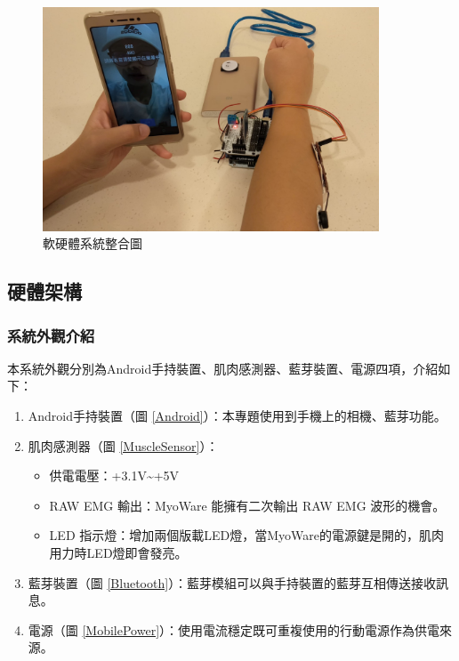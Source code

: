\documentclass[12pt]{article}  %
\theoremstyle{plain}
\begin{document}
\begin{figure}[h]  %
\centering
\includegraphics[width=10cm]{pic/ch2/system.jpg}
\caption{軟硬體系統整合圖} \label{system}
\end{figure}

\subsection{硬體架構}

\subsubsection{系統外觀介紹}
本系統外觀分別為Android手持裝置、肌肉感測器、藍芽裝置、電源四項，介紹如下：
\begin{enumerate}
\item Android手持裝置（圖 \ref{Android}）：本專題使用到手機上的相機、藍芽功能。
\item 肌肉感測器（圖 \ref{MuscleSensor}）：
\begin{itemize}
\item 供電電壓：+3.1V\textasciitilde +5V
\item RAW EMG 輸出：MyoWare 能擁有二次輸出 RAW EMG 波形的機會。
\item LED 指示燈：增加兩個版載LED燈，當MyoWare的電源鍵是開的，肌肉用力時LED燈即會發亮。
\end{itemize}
\item 藍芽裝置（圖 \ref{Bluetooth}）：藍芽模組可以與手持裝置的藍芽互相傳送接收訊息。
\item 電源（圖 \ref{MobilePower}）：使用電流穩定既可重複使用的行動電源作為供電來源。
\end{enumerate}
\end{document}
